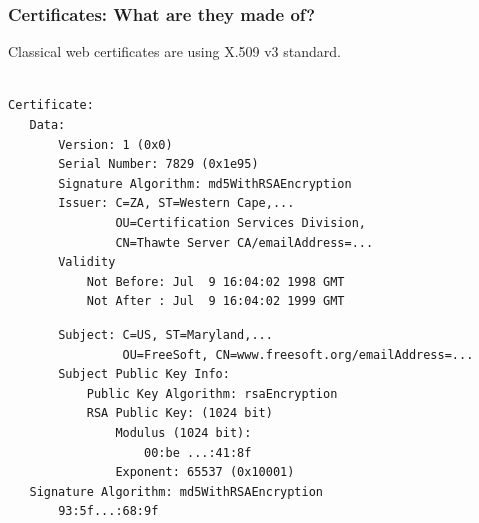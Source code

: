 \begin{frame}[fragile]
\frametitle{Certificates: What are they made of?}
Classical web certificates are using X.509 v3 standard.

\small
\begin{verbatim}

Certificate:
   Data:
       Version: 1 (0x0)
       Serial Number: 7829 (0x1e95)
       Signature Algorithm: md5WithRSAEncryption
       Issuer: C=ZA, ST=Western Cape,...
               OU=Certification Services Division,
               CN=Thawte Server CA/emailAddress=...
       Validity   
           Not Before: Jul  9 16:04:02 1998 GMT
           Not After : Jul  9 16:04:02 1999 GMT
\end{verbatim}

\end{frame}



\begin{frame}[fragile]

\small
\begin{verbatim}
       Subject: C=US, ST=Maryland,...
                OU=FreeSoft, CN=www.freesoft.org/emailAddress=...
       Subject Public Key Info:
           Public Key Algorithm: rsaEncryption
           RSA Public Key: (1024 bit)
               Modulus (1024 bit):
                   00:be ...:41:8f
               Exponent: 65537 (0x10001)
   Signature Algorithm: md5WithRSAEncryption
       93:5f...:68:9f
\end{verbatim}

\end{frame}
